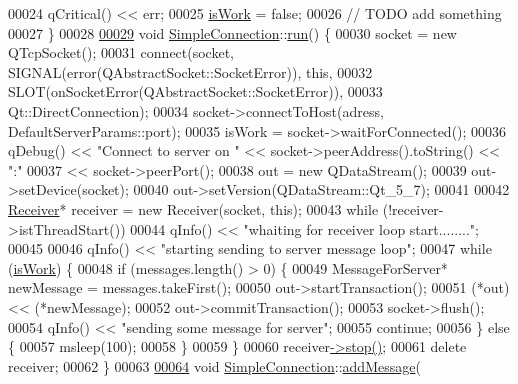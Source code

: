 \begin{DoxyCode}
00024   qCritical() << err;
00025   \hyperlink{a00125_a45a1e7ba5a9538bd382d24d364d0bbe5}{isWork} = \textcolor{keyword}{false};
00026   \textcolor{comment}{// TODO add something}
00027 \}
00028 
\hyperlink{a00125_a35045483589d14a436ee83346365ce70}{00029} \textcolor{keywordtype}{void} \hyperlink{a00125_a8360af71c89a54be93430b746d5fae08}{SimpleConnection}::\hyperlink{a00125_a35045483589d14a436ee83346365ce70}{run}() \{
00030   socket = \textcolor{keyword}{new} QTcpSocket();
00031   connect(socket, SIGNAL(error(QAbstractSocket::SocketError)), \textcolor{keyword}{this},
00032           SLOT(onSocketError(QAbstractSocket::SocketError)),
00033           Qt::DirectConnection);
00034   socket->connectToHost(adress, DefaultServerParams::port);
00035   isWork = socket->waitForConnected();
00036   qDebug() << \textcolor{stringliteral}{"Connect to server on "} << socket->peerAddress().toString() << \textcolor{stringliteral}{":"}
00037            << socket->peerPort();
00038   out = \textcolor{keyword}{new} QDataStream();
00039   out->setDevice(socket);
00040   out->setVersion(QDataStream::Qt\_5\_7);
00041 
00042   \hyperlink{a00133}{Receiver}* receiver = \textcolor{keyword}{new} Receiver(socket, \textcolor{keyword}{this});
00043   \textcolor{keywordflow}{while} (!receiver->istThreadStart())
00044     qInfo() << \textcolor{stringliteral}{"whaiting for receiver loop start........"};
00045 
00046   qInfo() << \textcolor{stringliteral}{"starting sending to server message loop"};
00047   \textcolor{keywordflow}{while} (\hyperlink{a00125_a45a1e7ba5a9538bd382d24d364d0bbe5}{isWork}) \{
00048     \textcolor{keywordflow}{if} (messages.length() > 0) \{
00049       MessageForServer* newMessage = messages.takeFirst();
00050       out->startTransaction();
00051       (*out) << (*newMessage);
00052       out->commitTransaction();
00053       socket->flush();
00054       qInfo() << \textcolor{stringliteral}{"sending some message for server"};
00055       \textcolor{keywordflow}{continue};
00056     \} \textcolor{keywordflow}{else} \{
00057       msleep(100);
00058     \}
00059   \}
00060   receiver\hyperlink{a00133_ab77d06e9677b12631ece8695a319e062}{->}\hyperlink{a00133_ab77d06e9677b12631ece8695a319e062}{stop}\hyperlink{a00133_ab77d06e9677b12631ece8695a319e062}{(}\hyperlink{a00133_ab77d06e9677b12631ece8695a319e062}{)};
00061   \textcolor{keyword}{delete} receiver;
00062 \}
00063 
\hyperlink{a00125_a0e40869759ba98f1964257d9c507b733}{00064} \textcolor{keywordtype}{void} \hyperlink{a00125_a8360af71c89a54be93430b746d5fae08}{SimpleConnection}::\hyperlink{a00125_a0e40869759ba98f1964257d9c507b733}{addMessage}(

\end{DoxyCode}
